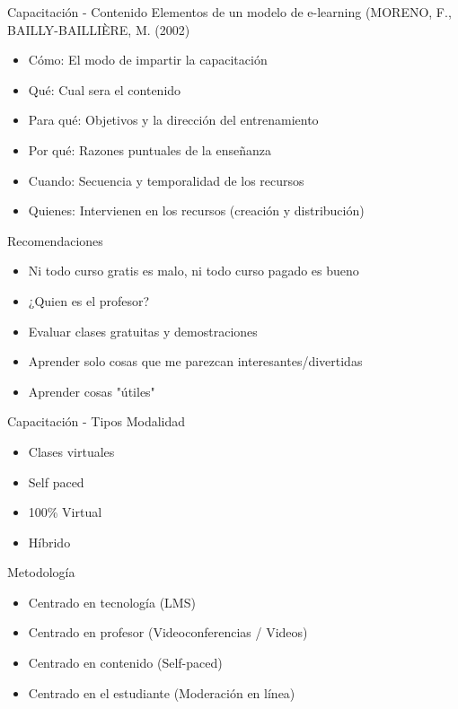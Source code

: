 \documentclass[aspectratio=169]{beamer}
\begin{document}
\begin{frame}[fragile]{Capacitación - Contenido}
    Elementos de un modelo de e-learning (MORENO, F., BAILLY-BAILLIÈRE, M. (2002)
    \begin{itemize}
        \item Cómo: El modo de impartir la capacitación
        \item Qué: Cual sera el contenido
        \item Para qué: Objetivos y la dirección del entrenamiento
        \item Por qué: Razones puntuales de la enseñanza
        \item Cuando: Secuencia y temporalidad de los recursos
        \item Quienes: Intervienen en los recursos (creación y distribución) 
    \end{itemize}
\end{frame}

\begin{frame}[fragile]{Recomendaciones}
    \begin{itemize}
        \item Ni todo curso gratis es malo, ni todo curso pagado es bueno
        \item ¿Quien es el profesor?
        \item Evaluar clases gratuitas y demostraciones
        \item Aprender solo cosas que me parezcan interesantes/divertidas
        \item Aprender cosas "útiles"
    \end{itemize}
\end{frame}

\begin{frame}[fragile]{Capacitación - Tipos}
    Modalidad
    \begin{itemize}
        \item Clases virtuales
        \item Self paced
        \item 100\% Virtual
        \item Híbrido
    \end{itemize}

    Metodología
\begin{itemize}
    \item Centrado en tecnología (LMS)
    \item Centrado en profesor (Videoconferencias / Videos)
    \item Centrado en contenido (Self-paced)
    \item Centrado en el estudiante (Moderación en línea)
\end{itemize}
\end{frame}
\end{document}
